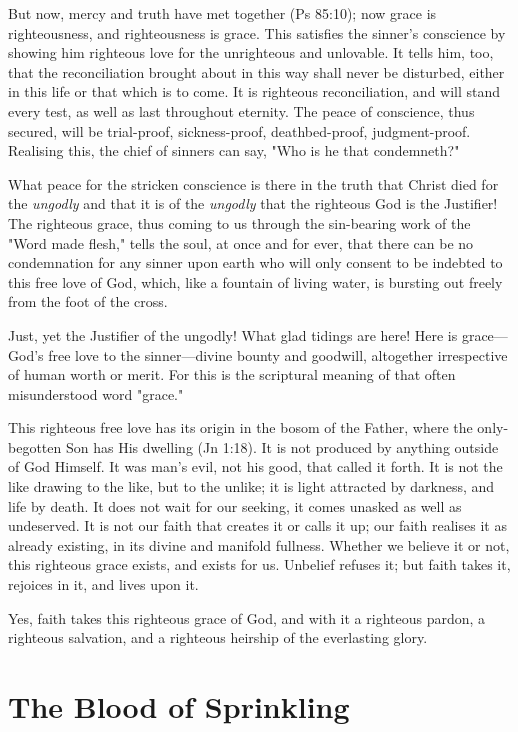 \documentclass[
]{book}
\begin{document}
But now, mercy and truth have met together (Ps 85:10); now grace is righteousness, and righteousness is grace. This satisfies the sinner's conscience by showing him righteous love for the unrighteous and unlovable. It tells him, too, that the reconciliation brought about in this way shall never be disturbed, either in this life or that which is to come. It is righteous reconciliation, and will stand every test, as well as last throughout eternity. The peace of conscience, thus secured, will be trial-proof, sickness-proof, deathbed-proof, judgment-proof. Realising this, the chief of sinners can say, "Who is he that condemneth?"

What peace for the stricken conscience is there in the truth that Christ died for the \emph{ungodly} and that it is of the \emph{ungodly} that the righteous God is the Justifier! The righteous grace, thus coming to us through the sin-bearing work of the "Word made flesh," tells the soul, at once and for ever, that there can be no condemnation for any sinner upon earth who will only consent to be indebted to this free love of God, which, like a fountain of living water, is bursting out freely from the foot of the cross.

Just, yet the Justifier of the ungodly! What glad tidings are here! Here is grace---God's free love to the sinner---divine bounty and goodwill, altogether irrespective of human worth or merit. For this is the scriptural meaning of that often misunderstood word "grace."

This righteous free love has its origin in the bosom of the Father, where the only-begotten Son has His dwelling (Jn 1:18). It is not produced by anything outside of God Himself. It was man's evil, not his good, that called it forth. It is not the like drawing to the like, but to the unlike; it is light attracted by darkness, and life by death. It does not wait for our seeking, it comes unasked as well as undeserved. It is not our faith that creates it or calls it up; our faith realises it as already existing, in its divine and manifold fullness. Whether we believe it or not, this righteous grace exists, and exists for us. Unbelief refuses it; but faith takes it, rejoices in it, and lives upon it.

Yes, faith takes this righteous grace of God, and with it a righteous pardon, a righteous salvation, and a righteous heirship of the everlasting glory.

\hypertarget{the-blood-of-sprinkling}{%
\chapter{The Blood of Sprinkling}\label{the-blood-of-sprinkling}}
\end{document}
